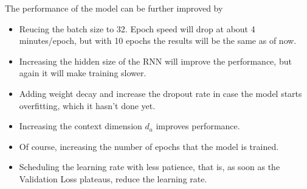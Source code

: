 \documentclass[12pt]{report}
\begin{document}
\noindent The performance of the model can be further improved by
\begin{itemize}
    \item Reucing the batch size to 32. Epoch speed will drop at about 4 minutes/epoch, but with
        10 epochs the results will be the same as of now.
    \item Increasing the hidden size of the RNN will improve the performance, but again it will
        make training slower.
    \item Adding weight decay and increase the dropout rate in case the model starts overfitting,
        which it hasn't done yet.
    \item Increasing the context dimension $d_a$ improves performance.
    \item Of course, increasing the number of epochs that the model is trained.
    \item Scheduling the learning rate with less patience, that is, as soon as the Validation
        Loss plateaus, reduce the learning rate.
\end{itemize}
\end{document}
